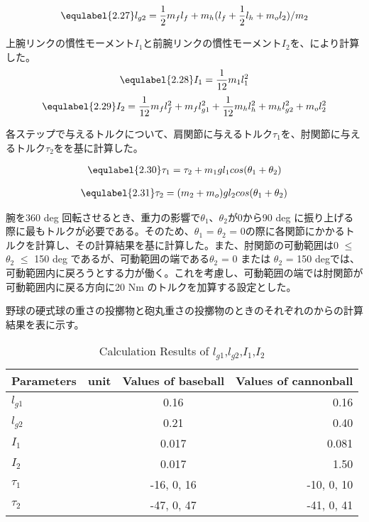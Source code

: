 \begin{eqnarray}
  \equlabel{2.27}
  l_{g2}=\frac{1}{2}m_{f}l_{f}+m_{h}(l_{f}+\frac{1}{2}l_{h}+m_{o}l_{2})/m_{2}
\end{eqnarray}

上腕リンクの慣性モーメント$I_{1}$と前腕リンクの慣性モーメント$I_{2}$を、により計算した。
\begin{eqnarray}
  \equlabel{2.28}
  I_{1}=\frac{1}{12}m_{1}l_{1}^{2}
\end{eqnarray}
\begin{eqnarray}
  \equlabel{2.29}
  I_{2}=\frac{1}{12}m_{f}l_{f}^{2}+m_{f}l_{g1}^{2}+\frac{1}{12}m_{h}l_{h}^{2}+m_{h}l_{g2}^{2}+m_{o}l_{2}^{2}
\end{eqnarray}

各ステップで与えるトルクについて、肩関節に与えるトルク$\tau_{1}$を、肘関節に与えるトルク$\tau_{2}$をを基に計算した。

\begin{eqnarray}
  \equlabel{2.30}
  \tau_{1} = \tau_{2} + m_{1}gl_{1}cos(\theta_{1} + \theta_{2})
\end{eqnarray}

\begin{eqnarray}
  \equlabel{2.31}
  \tau_{2} = (m_{2} + m_{o})gl_{2}cos(\theta_{1} + \theta_{2})
\end{eqnarray}

腕を360 deg 回転させるとき、重力の影響で$\theta_{1}$、$\theta_{2}$が0から90 deg に振り上げる際に最もトルクが必要である。そのため、$\theta_{1}$ = $\theta_{2}$ = 0の際に各関節にかかるトルクを計算し、その計算結果を基に計算した。また、肘関節の可動範囲は0 $\le$ $\theta_{2}$ $\le$ 150 deg であるが、可動範囲の端である$\theta_{2}$ = 0 または $\theta_{2}$ = 150 degでは、可動範囲内に戻ろうとする力が働く。これを考慮し、可動範囲の端では肘関節が可動範囲内に戻る方向に20 Nm のトルクを加算する設定とした。

野球の硬式球の重さの投擲物と砲丸重さの投擲物のときのそれぞれのからの計算結果を表に示す。
\begin{table}[tb]
  \begin{center}
    \caption{Calculation Results of $l_{g1}$,$l_{g2}$,$I_{1}$,$I_{2}$}
    \begin{tabular}{l|c|c|r}
      \hline
      Parameters & unit & Values of baseball & Values of cannonball \\
      \hline
      $l_{g1}$ & & 0.16 & 0.16 \\
      $l_{g2}$ & & 0.21 & 0.40 \\
      $I_{1}$ & & 0.017 & 0.081 \\
      $I_{2}$ & & 0.017 & 1.50 \\
      $\tau_{1}$ & & -16, 0, 16 & -10, 0, 10 \\
      $\tau_{2}$ & & -47, 0, 47 & -41, 0, 41 \\
      \hline
    \end{tabular}
  \end{center}
\end{table}

